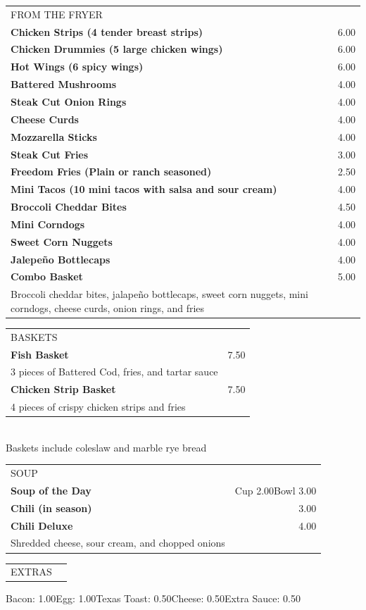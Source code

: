 \documentclass[10pt,notitlepage]{article}
\makeatletter
\newcommand*\ColText[1]{\uppercase{#1}}
\newenvironment{Group}[1]
	{\noindent\begin{tabular*}{\textwidth}{@{}p{.8\linewidth}@{\extracolsep{\fill}}r@{}}
		{\fontsize{16}{20}\selectfont\ColText{#1}}\\[0.8em]}
	{\end{tabular*}}
\newcommand*\Item[2]{%
	\sffamily\textbf{#1}\dotfill & #2}
\newcommand*\Desc[1]{%
	\sffamily\hspace*{1em}\small #1}
\makeatother
\begin{document}
	\vfill{}
	
	\begin{Group}{From the Fryer}
		\Item{Chicken Strips (4 tender breast strips)}{6.00} \\
		\Item{Chicken Drummies (5 large chicken wings)}{6.00} \\
		\Item{Hot Wings (6 spicy wings)}{6.00} \\
		\Item{Battered Mushrooms}{4.00} \\
		\Item{Steak Cut Onion Rings}{4.00} \\
		\Item{Cheese Curds}{4.00} \\
		\Item{Mozzarella Sticks}{4.00} \\
		\Item{Steak Cut Fries}{3.00} \\
		\Item{Freedom Fries (Plain or ranch seasoned)}{2.50} \\
		\Item{Mini Tacos (10 mini tacos with salsa and sour cream)}{4.00} \\
		\Item{Broccoli Cheddar Bites}{4.50} \\
		\Item{Mini Corndogs}{4.00} \\
		\Item{Sweet Corn Nuggets}{4.00} \\
		\Item{Jalepe\~{n}o Bottlecaps}{4.00} \\
		\Item{Combo Basket}{5.00} \\
		\Desc{Broccoli cheddar bites, jalape\~{n}o bottlecaps, sweet corn nuggets, mini corndogs, cheese curds, onion rings, and fries} \\
	\end{Group}
	
	\vfill{}
	
	\begin{Group}{Baskets}
		\Item{Fish Basket}{7.50} \\
		\Desc{3 pieces of Battered Cod, fries, and tartar sauce} \\
		\Item{Chicken Strip Basket}{7.50} \\
		\Desc{4 pieces of crispy chicken strips and fries} \\
	\end{Group}
	\\[\baselineskip]
	\centering Baskets include coleslaw and marble rye bread \\
	
	\vfill{}
	
	\begin{Group}{Soup}
		\Item{Soup of the Day}{Cup 2.00\hspace{0.2in}Bowl 3.00} \\
		\Item{Chili (in season)}{3.00} \\
		\Item{Chili Deluxe}{4.00} \\
		\Desc{Shredded cheese, sour cream, and chopped onions} \\
	\end{Group}
	
	\vfill{}
	
	\begin{Group}{Extras}
	\end{Group}
	\centering Bacon: 1.00\hspace{0.2in}Egg: 1.00\hspace{0.2in}Texas Toast: 0.50\hspace{0.2in}Cheese: 0.50\hspace{0.2in}Extra Sauce: 0.50\par
	
\end{document}
